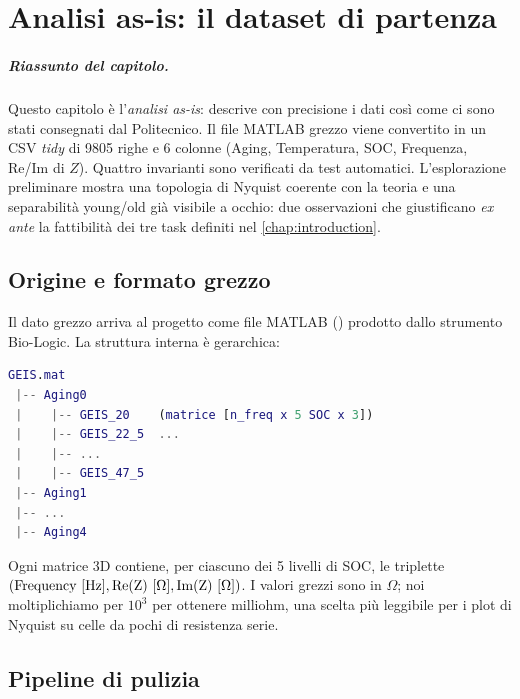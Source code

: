 \chapter{Analisi as-is: il dataset di partenza}
\label{chap:dataset}

\paragraph{Riassunto del capitolo.} Questo capitolo è l'\emph{analisi
as-is}: descrive con precisione i dati così come ci sono stati
consegnati dal Politecnico. Il file MATLAB grezzo viene convertito in
un CSV \emph{tidy} di \num{9805} righe e 6 colonne (Aging, Temperatura,
SOC, Frequenza, Re/Im di $Z$). Quattro invarianti sono verificati da
test automatici. L'esplorazione preliminare mostra una topologia di
Nyquist coerente con la teoria e una separabilità young/old già
visibile a occhio: due osservazioni che giustificano \emph{ex ante} la
fattibilità dei tre task definiti nel \cref{chap:introduction}.

\section{Origine e formato grezzo}

Il dato grezzo arriva al progetto come file MATLAB
() prodotto dallo strumento Bio-Logic. La
struttura interna è gerarchica:

\begin{lstlisting}[language=Matlab]
GEIS.mat
 |-- Aging0
 |    |-- GEIS_20    (matrice [n_freq x 5 SOC x 3])
 |    |-- GEIS_22_5  ...
 |    |-- ...
 |    |-- GEIS_47_5
 |-- Aging1
 |-- ...
 |-- Aging4
\end{lstlisting}

Ogni matrice 3D contiene, per ciascuno dei 5 livelli di SOC, le triplette
$(\text{Frequency [Hz]},\newline \text{Re(Z) [\(\Omega\)]}, \text{Im(Z) [\(\Omega\)]})$.
I valori grezzi sono in $\Omega$; noi moltiplichiamo per $10^3$ per
ottenere milliohm, una scelta più leggibile per i plot di Nyquist su
celle da pochi \milliohm{} di resistenza serie.

\newpage
\section{Pipeline di pulizia}

